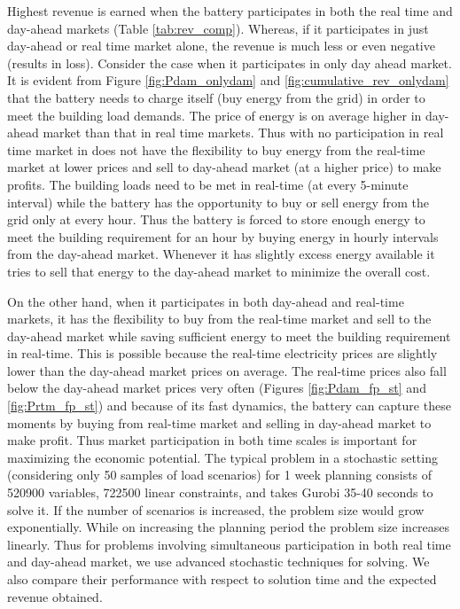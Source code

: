 \documentclass[11pt,twoside]{article}
\begin{document}
Highest revenue is earned when the battery participates in both the real time and day-ahead markets (Table \ref{tab:rev_comp}). Whereas, if it participates in just day-ahead or real time market alone, the revenue is much less or even negative (results in loss). Consider the case when it participates in only day ahead market. It is evident from Figure \ref{fig:Pdam_onlydam} and \ref{fig:cumulative_rev_onlydam} that the battery needs to charge itself (buy energy from the grid) in order to meet the building load demands. The price of energy is on average higher in day-ahead market than that in real time markets. Thus with no participation in real time market in does not have the flexibility to buy energy from the real-time market at lower prices and sell to day-ahead market (at a higher price) to make profits. The building loads need to be met in real-time (at every 5-minute interval) while the battery has the opportunity to buy or sell energy from the grid only at every hour. Thus the battery is forced to store enough energy to meet the building requirement for an hour by buying energy in hourly intervals from the day-ahead market. Whenever it has slightly excess energy available it tries to sell that energy to the day-ahead market to minimize the overall cost. 

On the other hand, when it participates in both day-ahead and real-time markets, it has the flexibility to buy from the real-time market and sell to the day-ahead market while saving sufficient energy to meet the building requirement in real-time. This is possible because the real-time electricity prices are slightly lower than the day-ahead market prices on average. The real-time prices also fall below the day-ahead market prices very often (Figures \ref{fig:Pdam_fp_st} and \ref{fig:Prtm_fp_st}) and because of its fast dynamics, the battery can capture these moments by buying from real-time market and selling in day-ahead market to make profit. 
Thus market participation in both time scales is important for maximizing the economic potential. The typical problem in a stochastic setting (considering only 50 samples of load scenarios) for 1 week planning consists of 520900 variables, 722500 linear constraints, and takes Gurobi 35-40 seconds to solve it. 
If the number of scenarios is increased, the problem size would grow exponentially. While on increasing the planning period the problem size increases linearly. Thus for problems involving simultaneous participation in both real time and day-ahead market, we use advanced stochastic techniques for solving. We also compare their performance with respect to solution time and the expected revenue obtained.
\end{document}
